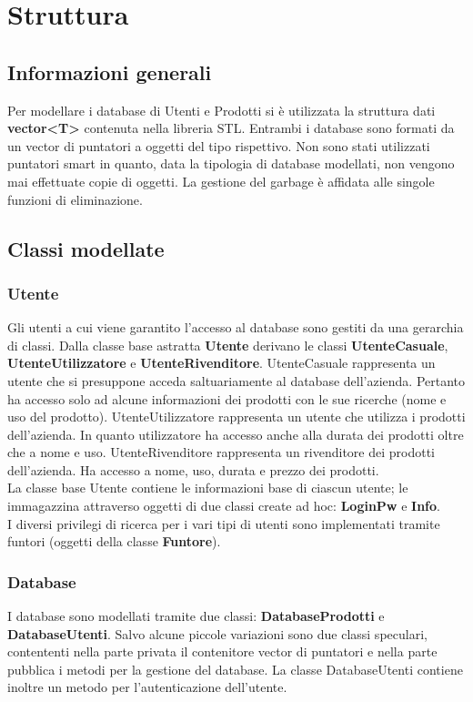 \documentclass[a4paper,10pt] {article}
\begin{document}
\newpage

\section{Struttura}

\subsection{Informazioni generali}
Per modellare i database di Utenti e Prodotti si è utilizzata la struttura dati \textbf{vector<T>} contenuta nella libreria STL. Entrambi i database sono formati
da un vector di puntatori a oggetti del tipo rispettivo. Non sono stati utilizzati puntatori smart in quanto, data la tipologia di database modellati, non vengono
mai effettuate copie di oggetti. La gestione del garbage è affidata alle singole funzioni di eliminazione.

\subsection{Classi modellate}
\subsubsection{Utente}
Gli utenti a cui viene garantito l'accesso al database sono gestiti da una gerarchia di classi. Dalla classe base astratta \textbf{Utente} derivano le classi 
\textbf{UtenteCasuale}, \textbf{UtenteUtilizzatore} e \textbf{UtenteRivenditore}. UtenteCasuale rappresenta un utente che si presuppone acceda saltuariamente al
database dell'azienda. Pertanto ha accesso solo ad alcune informazioni dei prodotti con le sue ricerche (nome e uso del prodotto). UtenteUtilizzatore rappresenta
un utente che utilizza i prodotti dell'azienda. In quanto utilizzatore ha accesso anche alla durata dei prodotti oltre che a nome e uso. UtenteRivenditore
rappresenta un rivenditore dei prodotti dell'azienda. Ha accesso a nome, uso, durata e prezzo dei prodotti.\\
La classe base Utente contiene le informazioni base di ciascun utente; le immagazzina attraverso oggetti di due classi create ad hoc: \textbf{LoginPw} e \textbf{Info}.\\
I diversi privilegi di ricerca per i vari tipi di utenti sono implementati tramite funtori (oggetti della classe \textbf{Funtore}).

\subsubsection{Database}
I database sono modellati tramite due classi: \textbf{DatabaseProdotti} e \textbf{DatabaseUtenti}. Salvo alcune piccole variazioni sono due classi speculari, contententi nella
parte privata il contenitore vector di puntatori e nella parte pubblica i metodi per la gestione del database. La classe DatabaseUtenti contiene inoltre un metodo
per l'autenticazione dell'utente.
\end{document}
